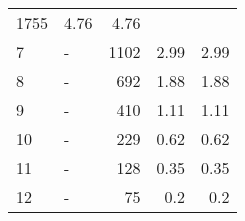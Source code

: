 \begin{longtable}{lXrrr}
       \num{1755} &
       \num[round-mode=places,round-precision=2]{4,76} &
         \num[round-mode=places,round-precision=2]{4,76} \\

     7 &
     \multicolumn{1}{X}{ -  } &


       \num{1102} &
       \num[round-mode=places,round-precision=2]{2,99} &
         \num[round-mode=places,round-precision=2]{2,99} \\

     8 &
     \multicolumn{1}{X}{ -  } &


       \num{692} &
       \num[round-mode=places,round-precision=2]{1,88} &
         \num[round-mode=places,round-precision=2]{1,88} \\

     9 &
     \multicolumn{1}{X}{ -  } &


       \num{410} &
       \num[round-mode=places,round-precision=2]{1,11} &
         \num[round-mode=places,round-precision=2]{1,11} \\

     10 &
     \multicolumn{1}{X}{ -  } &


       \num{229} &
       \num[round-mode=places,round-precision=2]{0,62} &
         \num[round-mode=places,round-precision=2]{0,62} \\

     11 &
     \multicolumn{1}{X}{ -  } &


       \num{128} &
       \num[round-mode=places,round-precision=2]{0,35} &
         \num[round-mode=places,round-precision=2]{0,35} \\

     12 &
     \multicolumn{1}{X}{ -  } &


       \num{75} &
       \num[round-mode=places,round-precision=2]{0,2} &
         \num[round-mode=places,round-precision=2]{0,2} \\


\end{longtable}
